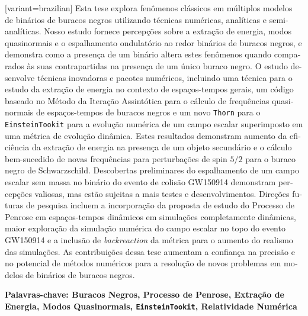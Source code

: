 \documentclass[12pt, twoside]{report}
\begin{document}
\begin{portuguese}[variant=brazilian]
  Esta tese explora fenômenos clássicos em múltiplos modelos de binários de buracos negros utilizando técnicas numéricas, analíticas e semi-analíticas. Nosso estudo fornece percepções sobre a extração de energia, modos quasinormais e o espalhamento ondulatório ao redor binários de buracos negros, e demonstra como a presença de um binário altera estes fenômenos quando comparados às suas contrapartidas na presença de um único buraco negro. O estudo desenvolve técnicas inovadoras e pacotes numéricos, incluindo uma técnica para o estudo da extração de energia no contexto de espaços-tempos gerais, um código baseado no Método da Iteração Assintótica para o cálculo de frequências quasinormais de espaços-tempos de buracos negros e um novo \texttt{Thorn} para o \texttt{EinsteinTookit} para a evolução numérica de um campo escalar superimposto em uma métrica de evolução dinâmica. Estes resultados demonstram aumento da eficiência da extração de energia na presença de um objeto secundário e o cálculo bem-sucedido de novas frequências para perturbações de spin $5/2$ para o buraco negro de Schwarzschild. Descobertas preliminares do espalhamento de um campo escalar sem massa no binário do evento de colisão GW150914 demonstram percepções valiosas, mas estão sujeitas a mais testes e desenvolvimentos. Direções futuras de pesquisa incluem a incorporação da proposta de estudo do Processo de Penrose em espaços-tempos dinâmicos em simulações completamente dinâmicas, maior exploração da simulação numérica do campo escalar no topo do evento GW150914 e a inclusão de \textit{backreaction} da métrica para o aumento do realismo das simulações. As contribuições dessa tese aumentam a confiança na precisão e no potencial de métodos numéricos para a resolução de novos problemas em modelos de binários de buracos negros.
\end{portuguese}

\vspace{0.5cm}


\textbf{\textportuguese{Palavras-chave: Buracos Negros, Processo de Penrose, Extração de Energia, Modos Quasinormais, \texttt{EinsteinTookit}, Relatividade Numérica}}

\begin{center}
  {\large{}\thispagestyle{empty}}{\large\par}
  \par\end{center}
\end{document}
